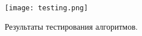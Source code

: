         \begin{figure}[h!]
            \centering
            \texttt{[image: testing.png]}
            \caption{Результаты тестирования алгоритмов.}
            \label{png:testing:result}
        \end{figure}
\newpage